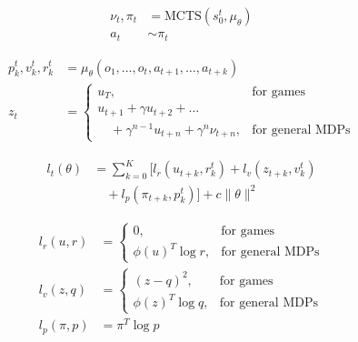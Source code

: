 \begin{align}
    \nu_t, \pi_t & = \text{MCTS}(s_0^t, \mu_\theta) \\
    a_t          & \sim \pi_t
\end{align}

\begin{align}
    p_k^t, v_k^t, r_k^t & = \mu_\theta(o_1, \ldots, o_t, a_{t+1}, \ldots, a_{t+k}) \\
    z_t                 & =
    \begin{cases}
        u_T,                                               & \text{for games}        \\
        u_{t+1} + \gamma u_{t+2} + \ldots \nonumber                                  \\
        \quad + \gamma^{n-1} u_{t+n} + \gamma^n \nu_{t+n}, & \text{for general MDPs}
    \end{cases}
\end{align}

\begin{align}
    l_t(\theta) & =
    \sum_{k=0}^K \big[ l_r(u_{t+k}, r_k^t) + l_v(z_{t+k}, v_k^t) \nonumber \\
                & \quad + l_p(\pi_{t+k}, p_k^t) \big] + c \|\theta\|^2
\end{align}

\begin{align}
    l_r(u, r)   & =
    \begin{cases}
        0,                & \text{for games}        \\
        \phi(u)^T \log r, & \text{for general MDPs}
    \end{cases} \\
    l_v(z, q)   & =
    \begin{cases}
        (z - q)^2,        & \text{for games}        \\
        \phi(z)^T \log q, & \text{for general MDPs}
    \end{cases} \\
    l_p(\pi, p) & = \pi^T \log p
\end{align}

